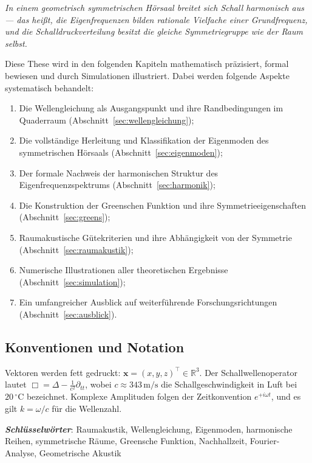 ﻿\documentclass[12pt, a4paper]{article}
\theoremstyle{definition}
\theoremstyle{remark}
\newcommand{\R}{\mathbb{R}}
\begin{document}
\begin{center}
\textit{In einem geometrisch symmetrischen Hörsaal breitet sich Schall
harmonisch aus --- das heißt, die Eigenfrequenzen bilden rationale
Vielfache einer Grundfrequenz, und die Schalldruckverteilung besitzt
die gleiche Symmetriegruppe wie der Raum selbst.}
\end{center}

Diese These wird in den folgenden Kapiteln mathematisch präzisiert, formal
bewiesen und durch Simulationen illustriert. Dabei werden folgende Aspekte
systematisch behandelt:

\begin{enumerate}
\item Die Wellengleichung als Ausgangspunkt und ihre Randbedingungen
  im Quaderraum (Abschnitt~\ref{sec:wellengleichung});
\item Die vollständige Herleitung und Klassifikation der Eigenmoden
  des symmetrischen Hörsaals (Abschnitt~\ref{sec:eigenmoden});
\item Der formale Nachweis der harmonischen Struktur des Eigenfrequenz\-spektrums
  (Abschnitt~\ref{sec:harmonik});
\item Die Konstruktion der Greenschen Funktion und ihre Symmetrieeigenschaften
  (Abschnitt~\ref{sec:greens});
\item Raumakustische Gütekriterien und ihre Abhängigkeit von der Symmetrie
  (Abschnitt~\ref{sec:raumakustik});
\item Numerische Illustrationen aller theoretischen Ergebnisse
  (Abschnitt~\ref{sec:simulation});
\item Ein umfangreicher Ausblick auf weiterführende Forschungsrichtungen
  (Abschnitt~\ref{sec:ausblick}).
\end{enumerate}

\subsection*{Konventionen und Notation}

Vektoren werden fett gedruckt: $\mathbf{x} = (x,y,z)^\top \in \R^3$.
Der Schallwellenoperator lautet $\Box = \Delta - \frac{1}{c^2}\partial_{tt}$,
wobei $c \approx 343\,\mathrm{m/s}$ die Schallgeschwindigkeit in Luft bei
$20\,^\circ\mathrm{C}$ bezeichnet. Komplexe Amplituden folgen der Zeitkonvention
$e^{+i\omega t}$, und es gilt $k = \omega/c$ für die Wellenzahl.

\textit{\textbf{Schlüsselwörter}}: Raumakustik, Wellengleichung, Eigenmoden,
harmonische Reihen, symmetrische Räume, Greensche Funktion, Nachhallzeit,
Fourier-Analyse, Geometrische Akustik
\end{document}
